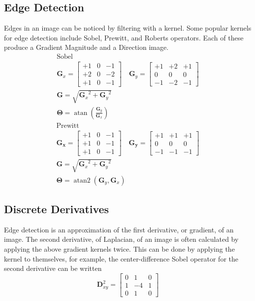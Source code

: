 \subsection{Edge Detection}
Edges in an image can be noticed by filtering with a kernel. Some popular kernels for edge detection include Sobel, Prewitt, and Roberts operators. Each of these produce a Gradient Magnitude and a Direction image.
\begin{align}
&\text{Sobel} & \nonumber\\
&\mathbf{G}_x = \begin{bmatrix} 
+1 & 0 & -1  \\
+2 & 0 & -2 \\
+1 & 0 & -1 
\end{bmatrix} 
\quad
\mathbf{G}_y = \begin{bmatrix} 
+1 & +2 & +1\\
0 & 0 & 0 \\
-1 & -2 & -1
\end{bmatrix} & \\
&\mathbf{G} = \sqrt{ {\mathbf{G}_x}^2 + {\mathbf{G}_y}^2 }&\\
&\mathbf{\Theta} = \operatorname{atan}\left({\frac{ \mathbf{G}_y} {\mathbf{G}_x }}\right)&
\end{align}
\begin{align}
 & \text{Prewitt}&\nonumber\\
& \mathbf{G_x} = \begin{bmatrix} 
+1 & 0 & -1 \\
+1 & 0 & -1 \\
+1 & 0 & -1
\end{bmatrix} 
\quad
\mathbf{G_y} = \begin{bmatrix} 
+1 & +1 & +1 \\
0 & 0 & 0 \\
-1 & -1 & -1
\end{bmatrix}&\\
&\mathbf{G} = \sqrt{ {\mathbf{G}_x}^2 + {\mathbf{G}_y}^2 }&\\
&\mathbf{\Theta} = \operatorname{atan2}\left({ \mathbf{G}_y , \mathbf{G}_x }\right)&
\end{align}
\subsection{Discrete Derivatives}
Edge detection is an approximation of the first derivative, or gradient, of an image. 
The second derivative, of Laplacian, of an image is often calculated by applying the above gradient kernels twice. This can be done by applying the kernel to themselves, for example, the center-difference Sobel operator for the second derivative can be written
\begin{equation}
\mathbf{D}^2_{xy}=\begin{bmatrix}0 & 1 & 0\\1 & -4 & 1\\0 & 1 & 0\end{bmatrix}
\end{equation}
